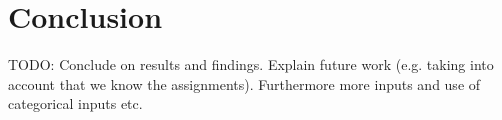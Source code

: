 \documentclass[12pt,a4paper]{report}
\theoremstyle{definition}
\begin{document}
\chapter{Conclusion}

TODO: Conclude on results and findings. Explain future work (e.g. taking into account that we know the assignments). Furthermore more inputs and use of categorical inputs etc.


%
%
%
%
%
%
%
%
\end{document}
